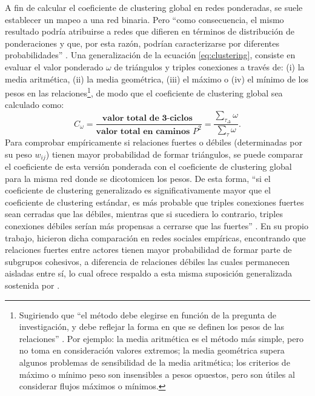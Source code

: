 \documentclass[letterpaper, 11pt]{book}
\theoremstyle{definition}
\theoremstyle{remark}
\begin{document}
A fin de calcular el coeficiente de clustering global en redes ponderadas, se suele establecer un mapeo a una red binaria. 
Pero ``como consecuencia, el mismo resultado podría atribuirse a redes que difieren en términos de distribución de ponderaciones y que, por esta razón, podrían caracterizarse por diferentes probabilidades'' \citep[156]{2009_Clustering_Opsahl}. 
Una generalización de la ecuación \ref{eq:clustering}, consiste en evaluar el valor ponderado $\omega$ de triángulos y triples conexiones a través de: (i) la media aritmética, (ii) la media geométrica, (iii) el máximo o (iv) el mínimo de los pesos en las relaciones\footnote{
    Sugiriendo que ``el método debe elegirse en función de la pregunta de investigación, y debe reflejar la forma en que se definen los pesos de las relaciones'' \citep[157]{2009_Clustering_Opsahl}. 
    Por ejemplo: la media aritmética es el método más simple, pero no toma en consideración valores extremos; la media geométrica supera algunos problemas de sensibilidad de la media aritmética; los criterios de máximo o mínimo peso son insensibles a pesos opuestos, pero son útiles al considerar flujos máximos o mínimos. 
}, de modo que el coeficiente de clustering global sea calculado como:
\begin{equation}\label{eq:clustering_ponderado}
    C_{\omega} = 
    \frac{ \textbf{valor total de 3-ciclos }}{\textbf{valor total en caminos } P^{2} } 
    = \frac{ \sum_{\tau_{\Delta}} \omega }{ \sum_{\tau} \omega }.
\end{equation}
Para comprobar empíricamente si relaciones fuertes o débiles (determinadas por su peso $w_{ij}$) tienen mayor probabilidad de formar triángulos, se puede comparar el coeficiente de esta versión ponderada con el coeficiente de clustering global para la misma red donde se dicotomicen los pesos. 
De esta forma, ``si el coeficiente de clustering generalizado es significativamente mayor que el coeficiente de clustering estándar, es más probable que triples conexiones fuertes sean cerradas que las débiles, mientras que si sucediera lo contrario, triples conexiones débiles serían más propensas a cerrarse que las fuertes'' \citep[161]{2009_Clustering_Opsahl}.
En su propio trabajo, \citet{2009_Clustering_Opsahl} hicieron dicha comparación en redes sociales empíricas, encontrando que relaciones fuertes entre actores tienen mayor probabilidad de formar parte de subgrupos cohesivos, a diferencia de relaciones débiles las cuales permanecen aisladas entre sí, lo cual ofrece respaldo a esta misma suposición generalizada sostenida por \citet{1983_Granovetter_WeakTies}. 
\end{document}
